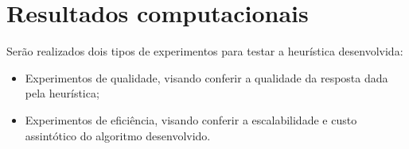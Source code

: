 \part{Resultados computacionais}
\label{sec:resultados}

Serão realizados dois tipos de experimentos para testar a heurística
desenvolvida:
\begin{itemize}
    \item Experimentos de qualidade, visando conferir a qualidade da
    resposta dada pela heurística;
    \item Experimentos de eficiência, visando conferir a
    escalabilidade e custo assintótico do algoritmo desenvolvido.
\end{itemize}





